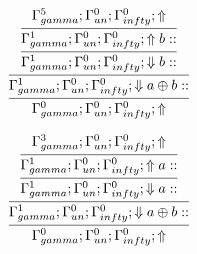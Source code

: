 \documentclass[a4paper, 11pt]{article}
\begin{document}
\[
\infer{\Gamma_{ gamma}^{0} ; \Gamma_{un}^{0} ; \Gamma_{ infty}^{0} ;  \Uparrow }
{\infer{\Gamma_{ gamma}^{1} ; \Gamma_{un}^{0} ; \Gamma_{ infty}^{0} ;  \Downarrow a \oplus b :: }
{\infer{\Gamma_{ gamma}^{1} ; \Gamma_{un}^{0} ; \Gamma_{ infty}^{0} ;  \Downarrow b :: }
{\infer{\Gamma_{ gamma}^{1} ; \Gamma_{un}^{0} ; \Gamma_{ infty}^{0} ;  \Uparrow b :: }
{\Gamma_{ gamma}^{5} ; \Gamma_{un}^{0} ; \Gamma_{ infty}^{0} ;  \Uparrow }}}}
\]

\[
\infer{\Gamma_{ gamma}^{0} ; \Gamma_{un}^{0} ; \Gamma_{ infty}^{0} ;  \Uparrow }
{\infer{\Gamma_{ gamma}^{1} ; \Gamma_{un}^{0} ; \Gamma_{ infty}^{0} ;  \Downarrow a \oplus b :: }
{\infer{\Gamma_{ gamma}^{1} ; \Gamma_{un}^{0} ; \Gamma_{ infty}^{0} ;  \Downarrow a :: }
{\infer{\Gamma_{ gamma}^{1} ; \Gamma_{un}^{0} ; \Gamma_{ infty}^{0} ;  \Uparrow a :: }
{\Gamma_{ gamma}^{3} ; \Gamma_{un}^{0} ; \Gamma_{ infty}^{0} ;  \Uparrow }}}}
\]
\end{document}
